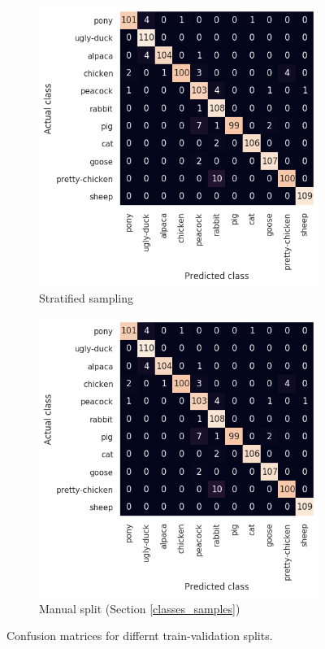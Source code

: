 \documentclass{l4proj}
\begin{document}
\begin{figure}[ht]
  \centering
  \begin{subfigure}[h!]{0.4\textwidth}
    \includegraphics[width=\textwidth]{images/evaluation/confusion/vis_fir_confusion.png}
    \caption{Stratified sampling}
    \label{fig:conf_stratified}
  \end{subfigure}
  \begin{subfigure}[h!]{0.4\textwidth}
    \includegraphics[width=\textwidth]{images/evaluation/confusion/vis_fir_confusion.png}
    \caption{Manual split (Section \ref{classes_samples})}
    \label{fig:conf_stratified}
  \end{subfigure}
  \caption{Confusion matrices for differnt train-validation splits.}
\end{figure}
\end{document}
